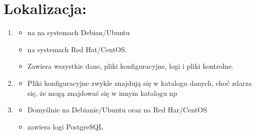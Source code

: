 \documentclass[letterpaper,10pt,polish]{sphinxmanual}
\begin{document}
\section{Lokalizacja:}
\label{\detokenize{DB-Konfiguracja-bazy-danych/source/rozdzialy/rozdzial1:lokalizacja}}\begin{enumerate}
%
\item {} \begin{description}
\begin{itemize}
\item {} 
\sphinxAtStartPar
{} na na systemach Debian/Ubuntu

\item {} 
\sphinxAtStartPar
{} na systemach Red Hat/CentOS.

\item {} 
\sphinxAtStartPar
Zawiera wszystkie dane, pliki konfiguracyjne, logi i pliki kontrolne.

\end{itemize}

\end{description}

\item {} \begin{description}
\begin{itemize}
\item {} 
\sphinxAtStartPar
Pliki konfiguracyjne zwykle znajdują się w katalogu danych, choć zdarza się, że mogą znajdować się w innym katalogu np 

\end{itemize}

\end{description}

\item {} \begin{description}
\begin{itemize}
\item {} 
\sphinxAtStartPar
Domyślnie  na Debianie/Ubuntu oraz  na Red Har/CentOS

\item {} 
\sphinxAtStartPar
zawiera logi PostgreSQL

\end{itemize}

\end{description}

\end{enumerate}
\end{document}
